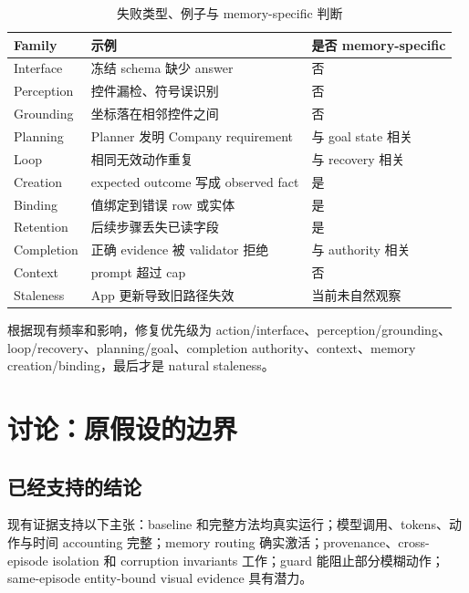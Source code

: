 \documentclass[12pt,a4paper]{ctexart}
\begin{document}
\begin{table}[H]
    \centering
    \caption{失败类型、例子与 memory-specific 判断}
    \label{tab:taxonomy}
    \small
    \begin{tabularx}{\textwidth}{p{2.5cm}p{5.8cm}Y}
        \toprule
        Family & 示例 & 是否 memory-specific \\
        \midrule
        Interface & 冻结 schema 缺少 answer & 否 \\
        Perception & 控件漏检、符号误识别 & 否 \\
        Grounding & 坐标落在相邻控件之间 & 否 \\
        Planning & Planner 发明 Company requirement & 与 goal state 相关 \\
        Loop & 相同无效动作重复 & 与 recovery 相关 \\
        Creation & expected outcome 写成 observed fact & 是 \\
        Binding & 值绑定到错误 row 或实体 & 是 \\
        Retention & 后续步骤丢失已读字段 & 是 \\
        Completion & 正确 evidence 被 validator 拒绝 & 与 authority 相关 \\
        Context & prompt 超过 cap & 否 \\
        Staleness & App 更新导致旧路径失效 & 当前未自然观察 \\
        \bottomrule
    \end{tabularx}
\end{table}

根据现有频率和影响，修复优先级为 action/interface、perception/grounding、loop/recovery、planning/goal、completion authority、context、memory creation/binding，最后才是 natural staleness。

\section{讨论：原假设的边界}

\subsection{已经支持的结论}

现有证据支持以下主张：baseline 和完整方法均真实运行；模型调用、tokens、动作与时间 accounting 完整；memory routing 确实激活；provenance、cross-episode isolation 和 corruption invariants 工作；guard 能阻止部分模糊动作；same-episode entity-bound visual evidence 具有潜力。
\end{document}

